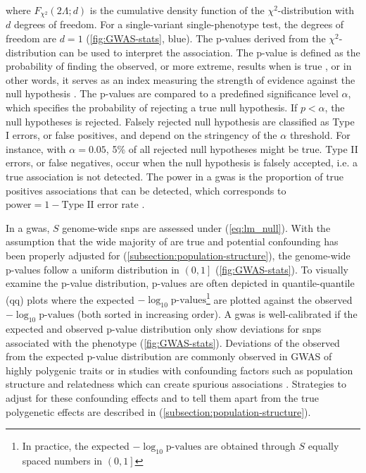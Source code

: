 where \(F_{\chi^2}\left(2\Lambda; d\right)\) is the cumulative density function of the \(\chi^2\)-distribution with \(d\) degrees of freedom. For a single-variant single-phenotype test, the degrees of freedom are \(d=1\) (\cref{fig:GWAS-stats}, blue). The p-values derived from the \(\chi^2\)-distribution can be used to interpret the association. The p-value is defined as the probability of finding the observed, or more extreme, results when \tnullH is true \citep{Krzywinski2013a}, or in other words, it serves as an index measuring the strength of evidence against the null hypothesis \citep{Sterne2001}. The p-values are compared to a predefined significance level \(\alpha\), which specifies the probability of rejecting a true null hypothesis. If \(p < \alpha\), the null hypotheses is rejected. Falsely rejected null hypothesis are classified as Type I errors, or false positives, and depend on the stringency of the \(\alpha\) threshold. For instance, with  \(\alpha=0.05\), 5\% of all rejected null hypotheses might be true. Type II errors, or false negatives, occur when the null hypothesis is falsely accepted, i.e. a true association is not detected. The power in a \gls{gwas} is the proportion of true positives associations that can be detected, which corresponds to \(\text{power} = 1 - \text{Type II error rate}\)  \citep{Krzywinski2013a,Krzywinski2013b}.

In a \gls{gwas}, \(S\) genome-wide \glspl{snp} are assessed under \tnullH (\cref{eq:lm_null}). With the assumption that the wide majority of \tnullH are true and potential confounding has been properly adjusted for (\cref{subsection:population-structure}), the genome-wide p-values follow a uniform distribution in \(\left(0,1\right]\) (\cref{fig:GWAS-stats}). To visually examine the p-value distribution, p-values are often depicted in quantile-quantile (qq) plots where the expected \(-\log_{10} \text{p-values}\)\footnote{In practice, the expected \(-\log_{10} \text{p-values}\) are obtained through \(S\) equally spaced numbers in \(\left(0,1\right]\)} are plotted against the observed \(-\log_{10} \text{p-values}\) (both sorted in increasing order). A \gls{gwas} is well-calibrated if the expected and observed p-value distribution only show deviations for \glspl{snp} associated with the phenotype (\cref{fig:GWAS-stats}). Deviations of the observed from the expected p-value distribution are commonly observed in GWAS of highly polygenic traits or in studies with confounding factors such as population structure and relatedness which can create spurious associations \citep{Marchini2004,Balding2006,Spielman1993,Lander1994}. Strategies to adjust for these confounding effects and to tell them apart from the true polygenetic effects are described in (\cref{subsection:population-structure}). 


